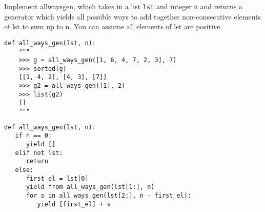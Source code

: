 \begin{blocksection}
\question Implement all\textunderscore ways\textunderscore gen, which takes in a list \texttt{lst} and integer \texttt{n} and returns a generator which yields all possible ways to add together non-consecutive elements of lst to sum up to n. You can assume all elements of lst are positive.
\newline
\begin{lstlisting}
def all_ways_gen(lst, n):
    """
    >>> g = all_ways_gen([1, 6, 4, 7, 2, 3], 7)
    >>> sorted(g)
    [[1, 4, 2], [4, 3], [7]]
    >>> g2 = all_ways_gen([1], 2)
    >>> list(g2)
    []
    """
\end{lstlisting}
\begin{solution}
\begin{lstlisting}
def all_ways_gen(lst, n):
   if n == 0:
      yield []
   elif not lst:
      return
   else:
      first_el = lst[0]
      yield from all_ways_gen(lst[1:], n)
      for s in all_ways_gen(lst[2:], n - first_el):
         yield [first_el] + s
\end{lstlisting}
\end{solution}
\end{blocksection}